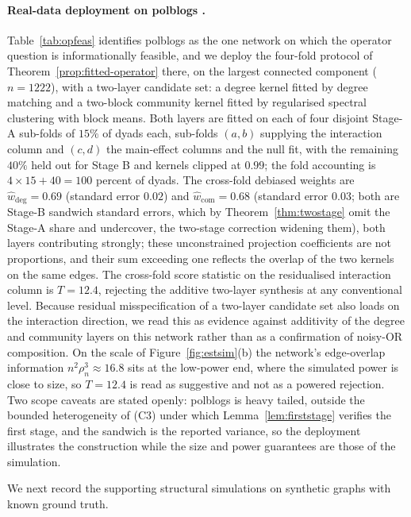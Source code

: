 \documentclass[12pt]{article}
\newcommand{\1}{\mathbf{1}}
\begin{document}
\paragraph{Real-data deployment on \textsf{polblogs} \citep{adamic2005political}.}
Table~\ref{tab:opfeas} identifies \textsf{polblogs} as the one network on which the operator
question is informationally feasible, and we deploy the four-fold protocol of
Theorem~\ref{prop:fitted-operator} there, on the largest connected component ($n=1222$), with a
two-layer candidate set: a degree kernel fitted by degree matching and a two-block community kernel fitted by
regularised spectral clustering with block means. Both layers are fitted on each of four disjoint
Stage-A sub-folds of $15\%$ of dyads each, sub-folds $(a,b)$ supplying the interaction column and
$(c,d)$ the main-effect columns and the null fit, with the remaining $40\%$ held out for Stage B
and kernels clipped at $0.99$; the fold accounting is $4\times15+40=100$ percent of dyads. The cross-fold debiased weights are
$\widehat w_{\mathrm{deg}}=0.69$ (standard error $0.02$) and $\widehat w_{\mathrm{com}}=0.68$
(standard error $0.03$; both are Stage-B sandwich standard errors, which by
Theorem~\ref{thm:twostage} omit the Stage-A share and undercover, the two-stage correction
widening them), both layers contributing strongly; these unconstrained projection
coefficients are not proportions, and their sum exceeding one reflects the overlap of the two
kernels on the same edges. The cross-fold score statistic on the residualised interaction column is
$T=12.4$, rejecting the additive two-layer synthesis at any conventional level. Because residual
misspecification of a two-layer candidate set also loads on the interaction direction, we read this as
evidence against additivity of the degree and community layers on this network rather than as a
confirmation of noisy-OR composition. On the scale of Figure~\ref{fig:estsim}(b) the network's edge-overlap
information $n^2\rho_n^3\approx16.8$ sits at the low-power end, where the simulated power is close to
size, so $T=12.4$ is read as suggestive and not as a powered rejection. Two scope caveats are stated openly: \textsf{polblogs} is
heavy tailed, outside the bounded heterogeneity of (C3) under which Lemma~\ref{lem:firststage}
verifies the first stage, and the sandwich is the reported variance, so the deployment illustrates
the construction while the size and power guarantees are those of the simulation.


\medskip
We next record the supporting structural simulations on synthetic graphs with known ground truth.
\end{document}
